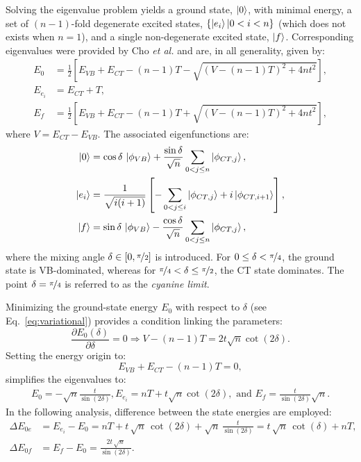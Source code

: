 \documentclass[journal=jpcafh]{achemso}
\begin{document}
Solving the eigenvalue problem yields a ground state, $\ket{0}$, with minimal energy, a set of $(n-1)$-fold degenerate excited states, $\{\ket{e_i} | 0<i< n\}$ (which does not exists when $n=1$), and a single non-degenerate excited state, $\ket{f}$.
Corresponding eigenvalues were provided by Cho \emph{et al.} \cite{choNonlinearOpticalProperties2002} and are, in all generality, given by:
\begin{align}
	E_{0} &= \frac{1}{2} \left[E_{VB} + E_{CT} - (n-1)T - \sqrt{(V - (n-1)T)^2 + 4nt^2}\right], \nonumber\\
	E_{e_i} &= E_{CT} + T, \nonumber\\
	E_{f} &= \frac{1}{2} \left[E_{VB} + E_{CT} - (n-1)T + \sqrt{(V - (n-1)T)^2 + 4nt^2}\right],
\end{align}
where $V = E_{CT} - E_{VB}$. 
The associated eigenfunctions are:
\begin{align}
	\ket{0} &= \cos\delta\,\ket{\phi_{VB}} + \frac{\sin\delta}{\sqrt{n}} \sum_{0<j\leq n} \ket{\phi_{CT,j}},\nonumber\\
	\ket{e_i} &= \frac{1}{\sqrt{i(i+1)}}\left[- \sum_{0<j\leq i} \ket{\phi_{CT,j}} +  i \ket{\phi_{CT,i+1}}\right],\nonumber\\
	\ket{f} &= \sin\delta\,\ket{\phi_{VB}} - \frac{\cos\delta}{\sqrt{n}} \sum_{0<j\leq n} \ket{\phi_{CT,j}},
\end{align}
where the mixing angle $\delta \in [0, \nicefrac{\pi}{2}]$ is introduced. For $0 \leq \delta < \nicefrac{\pi}{4}$, the ground state is VB-dominated, whereas for $\nicefrac{\pi}{4} < \delta \leq \nicefrac{\pi}{2}$, the CT state dominates. The point $\delta = \nicefrac{\pi}{4}$ is referred to as the \textit{cyanine limit}.

Minimizing the ground-state energy $E_0$ with respect to $\delta$ (see Eq.~\eqref{eq:variational})  provides a condition linking the parameters:
\begin{equation}
	\frac{\partial E_0(\delta)}{\partial \delta} = 0 \Rightarrow V - (n-1)T = 2t \sqrt{n} \cot(2\delta). \label{eq:cot}
\end{equation}
Setting the energy origin to:
\begin{equation}
	E_{VB} + E_{CT} - (n-1)T = 0, \label{eq:eorig}
\end{equation}
simplifies the eigenvalues to:
\begin{align}
	E_{0} = -\sqrt{n} \frac{t}{\sin(2\delta)}, E_{e_i} = nT + t \sqrt{n} \cot(2\delta), \text{ and }
	E_{f} =  \frac{t}{\sin(2\delta)}\sqrt{n}.\label{eq:energies}
\end{align}
In the following analysis, difference between the state energies are employed:\begin{align}
	\Delta E_{0e} &= E_{e_i} - E_{0} = nT + t\,\sqrt{n}\,\cot{(2\delta)} + \sqrt{n}\,\frac{t}{\sin{(2\delta)}}  = t\,\sqrt{n}\,\cot(\delta) + nT,\nonumber\\
	\Delta E_{0f} &= E_f - E_0 = \frac{2t\,\sqrt{n}}{\sin(2\delta)}.
\end{align}
\end{document}
